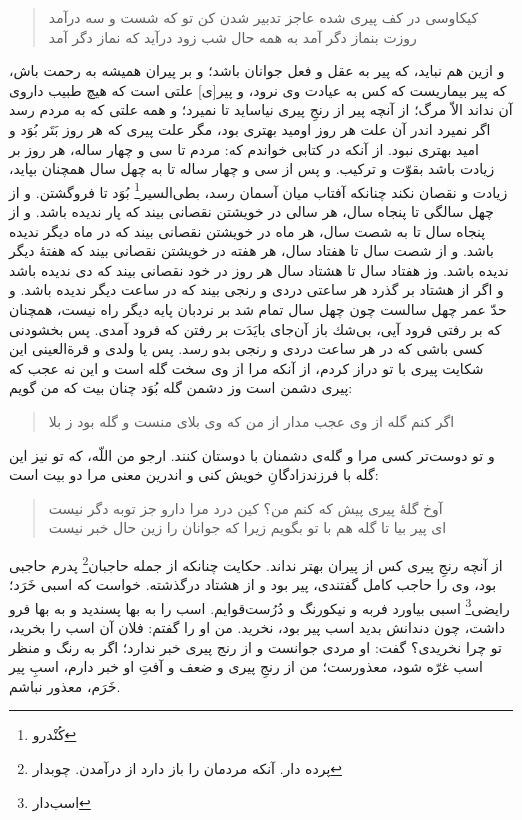 \begin{quote}
\centering
كيكاوسى در كف پيرى شده عاجز  \quad \quad 
تدبير شدن كن تو كه شست و سه درآمد \\
روزت بنماز دگر آمد به همه حال \quad \quad 
 شب زود درآيد كه نماز دگر آمد
\end{quote}

و ازين هم نبايد، كه پير به عقل و فعل جوانان باشد؛ و بر پيران هميشه به رحمت باش، كه پير بيماريست كه كس به عيادت وى نرود، و پير[ى] علتى است كه هيچ طبيب داروى آن نداند الاّ مرگ؛ از آنچه پير از رنجِ پيرى نياسايد تا نميرد؛ و همه علتى كه به مردم رسد اگر نميرد اندر آن علت هر روز اوميد بهترى بود، مگر علت پيرى كه هر روز بَتَر بُوَد و اميد بهترى نبود. از آنكه در كتابى خواندم كه: مردم تا سى و چهار ساله، هر روز بر زيادت باشد بقوّت و تركيب. و پس از سى و چهار ساله تا به چهل سال همچنان بپايد، زيادت و نقصان نكند چنانكه آفتاب ميان آسمان رسد، بطى‌السير\footnote{کُنْدرو} بُوَد تا فروگشتن. و از چهل سالگى تا پنجاه سال، هر سالى در خويشتن نقصانى بيند كه پار نديده باشد. و از پنجاه سال تا به شصت سال، هر ماه در خويشتن نقصانى بيند كه در ماه ديگر نديده باشد. و از شصت سال تا هفتاد سال، هر هفته در خويشتن نقصانى بيند كه هفتۀ ديگر نديده باشد. وز هفتاد سال تا هشتاد سال هر روز در خود نقصانى بيند كه دى نديده باشد و اگر از هشتاد بر گذرد هر ساعتى دردى و رنجى بيند كه در ساعت ديگر نديده باشد. و حدّ عمر چهل سالست چون چهل سال تمام شد بر نردبان پايه ديگر راه نيست، همچنان كه بر رفتى فرود آيى، بى‌شك باز آن‌جاى بايَدَت بر رفتن كه فرود آمدى. پس بخشودنى كسى باشى كه در هر ساعت دردى و رنجى بدو رسد. پس يا ولدى و قرة‌العينى اين شكايت پيرى با تو دراز كردم، از آنكه مرا از وى سخت گله است و اين نه عجب كه پيرى دشمن است وز دشمن گله بُوَد چنان بيت كه من گويم:

\begin{quote}
\centering
اگر كنم گله از وى عجب مدار از من \quad \quad 
 كه وى بلاى منست و گله بود ز بلا
\end{quote}

و تو دوست‌تر كسى مرا و گله‌ی دشمنان با دوستان كنند. ارجو من اللّه، كه تو نيز اين گله با فرزند‌زادگانِ خويش كنى و اندرين معنى مرا دو بيت است:

\begin{quote}
\centering
آوخ گلۀ پيرى پيش كه كنم من‌؟ \quad \quad 
كين درد مرا دارو جز توبه دگر نيست \\
اى پير بيا تا گله هم با تو بگويم \quad \quad 
زيرا كه جوانان را زين حال خبر نيست
\end{quote}

از آنچه رنجِ پيرى كس از پيران بهتر نداند. حكايت چنانكه از جمله حاجبان\footnote{پرده دار. آنکه مردمان را باز دارد از درآمدن. چوبدار} پدرم حاجبى بود، وى را حاجب كامل گفتندى، پير بود و از هشتاد درگذشته. خواست كه اسبى خَرَد؛ رايضى\footnote{اسب‌دار}  اسبى بياورد فربه و نيكو‌رنگ و دُرُست‌قوايم. اسب را به بها پسنديد و به بها فرو داشت، چون دندانش بديد اسب پير بود، نخريد. من او را گفتم: فلان آن اسب را بخريد، تو چرا نخريدى‌؟ گفت: او مردى جوانست و از رنج پيرى خبر ندارد؛ اگر به رنگ و منظر اسب غرّه شود، معذورست؛ من از رنجِ پيرى و ضعف و آفتِ او خبر دارم، اسبِ پير خَرَم، معذور نباشم.


